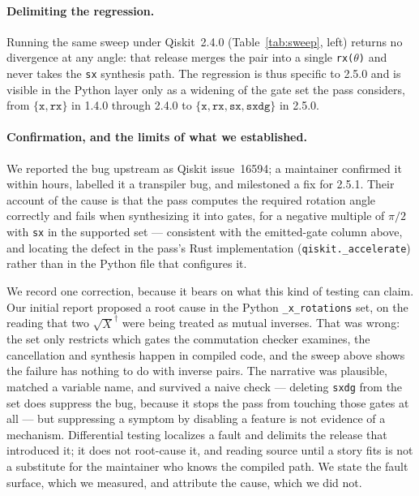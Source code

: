 \documentclass[11pt]{article}
\begin{document}
\paragraph{Delimiting the regression.}
Running the same sweep under Qiskit~2.4.0 (Table~\ref{tab:sweep}, left)
returns no divergence at any angle: that release merges the pair into a
single \texttt{rx($\theta$)} and never takes the \texttt{sx} synthesis
path. The regression is thus specific to 2.5.0 and is visible in the
Python layer only as a widening of the gate set the pass considers, from
$\{\texttt{x},\texttt{rx}\}$ in 1.4.0 through 2.4.0 to
$\{\texttt{x},\texttt{rx},\texttt{sx},\texttt{sxdg}\}$ in 2.5.0.

\paragraph{Confirmation, and the limits of what we established.}
We reported the bug upstream as Qiskit issue~16594; a maintainer
confirmed it within hours, labelled it a transpiler bug, and milestoned a
fix for 2.5.1. Their account of the cause is that the pass computes the
required rotation angle correctly and fails when synthesizing it into
gates, for a negative multiple of $\pi/2$ with \texttt{sx} in the
supported set --- consistent with the emitted-gate column above, and
locating the defect in the pass's Rust implementation
(\texttt{qiskit.\_accelerate}) rather than in the Python file that
configures it.

We record one correction, because it bears on what this kind of testing
can claim. Our initial report proposed a root cause in the Python
\texttt{\_x\_rotations} set, on the reading that two $\sqrt{X}^\dagger$
were being treated as mutual inverses. That was wrong: the set only
restricts which gates the commutation checker examines, the cancellation
and synthesis happen in compiled code, and the sweep above shows the
failure has nothing to do with inverse pairs. The narrative was
plausible, matched a variable name, and survived a naive check --- deleting
\texttt{sxdg} from the set does suppress the bug, because it stops the
pass from touching those gates at all --- but suppressing a symptom by
disabling a feature is not evidence of a mechanism. Differential testing
localizes a fault and delimits the release that introduced it; it does
not root-cause it, and reading source until a story fits is not a
substitute for the maintainer who knows the compiled path. We state the
fault surface, which we measured, and attribute the cause, which we did
not.
\end{document}
